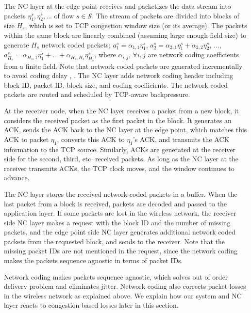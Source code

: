 \documentclass[conference]{IEEEtran}
\newcommand{\Sset}{\mathcal{S}}
\begin{document}
The NC layer at the edge point receives and packetizes the data stream into packets  $\eta_1^{s}, \eta_2^{s}, ...$ of flow $s \in \Sset$. The stream of packets are divided into blocks of size $H_s$, which is set to TCP congestion window size (or its average). The packets within the same block are linearly combined (assuming large enough field size) to generate $H_s$ network coded packets; $a_1^{s} = \alpha_{1,1} \eta_1^{s}$, $a_2^{s} = \alpha_{2,1}\eta_1^{s} + \alpha_{2,2}\eta_2^{s}$, $...$, $a_{H_{s}}^{s} = \alpha_{H_{s},1}\eta_1^{s} + ... + \alpha_{H_{s},H_{s}}\eta_{H_{s}}^{s}$, where $\alpha_{i,j}$, $\forall i,j$ are network coding coefficients from a finite field. Note that network coded packets are generated incrementally to avoid coding delay \cite{practical_NC}, \cite{i2nc}. The NC layer adds network coding header including block ID, packet ID, block size, and coding coefficients. The network coded packets are routed and scheduled by TCP-aware backpressure.

At the receiver node, when the NC layer receives a packet from a new block, it considers the received packet as the first packet in the block. It generates an ACK, sends the ACK back to the NC layer at the edge point, which matches this ACK to packet $\eta_1$, converts this ACK to $\eta_1$'s ACK, and transmits the ACK information to the TCP source. Similarly, ACKs are generated at the receiver side for the second, third, etc. received packets. As long as the NC layer at the receiver transmits ACKs, the TCP clock moves, and the window continues to advance.


The NC layer stores the received network coded packets in a buffer. When the last packet from a block is received, packets are decoded and passed to the application layer. If some packets are lost in the wireless network, the receiver side NC layer makes a request with the block ID and the number of missing packets, and the edge point side NC layer generates additional network coded packets from the requested block, and sends to the receiver. Note that the missing packet IDs are not mentioned in the request, since the network coding makes the packets sequence agnostic in terms of packet IDs.

Network coding makes packets sequence agnostic, which solves out of order delivery problem and eliminates jitter. Network coding also corrects packet losses in the wireless network as explained above. We explain how our system and NC layer reacts to congestion-based losses later in this section.
\end{document}
